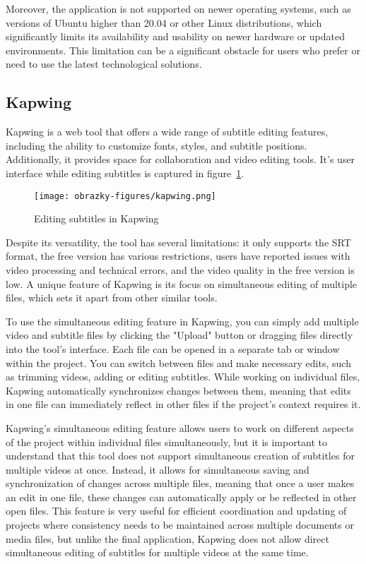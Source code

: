 Moreover, the application is not supported on newer operating systems, such as versions of Ubuntu higher than 20.04 or other Linux distributions, which significantly limits its availability and usability on newer hardware or updated environments. This limitation can be a significant obstacle for users who prefer or need to use the latest technological solutions.

\subsection{Kapwing}

Kapwing is a web tool that offers a wide range of subtitle editing features, including the ability to customize fonts, styles, and subtitle positions. Additionally, it provides space for collaboration and video editing tools. It's user interface while editing subtitles is captured in figure~\ref{fig:kapwing}.

\begin{figure}[ht]
    \centering
    \texttt{[image: obrazky-figures/kapwing.png]}
    \caption{Editing subtitles in Kapwing}
    \label{fig:kapwing}
\end{figure}

Despite its versatility, the tool has several limitations: it only supports the SRT format, the free version has various restrictions, users have reported issues with video processing and technical errors, and the video quality in the free version is low. A unique feature of Kapwing is its focus on simultaneous editing of multiple files, which sets it apart from other similar tools.

To use the simultaneous editing feature in Kapwing, you can simply add multiple video and subtitle files by clicking the "Upload" button or dragging files directly into the tool's interface. Each file can be opened in a separate tab or window within the project. You can switch between files and make necessary edits, such as trimming videos, adding or editing subtitles. While working on individual files, Kapwing automatically synchronizes changes between them, meaning that edits in one file can immediately reflect in other files if the project's context requires it.

Kapwing's simultaneous editing feature allows users to work on different aspects of the project within individual files simultaneously, but it is important to understand that this tool does not support simultaneous creation of subtitles for multiple videos at once. Instead, it allows for simultaneous saving and synchronization of changes across multiple files, meaning that once a user makes an edit in one file, these changes can automatically apply or be reflected in other open files. This feature is very useful for efficient coordination and updating of projects where consistency needs to be maintained across multiple documents or media files, but unlike the final application, Kapwing does not allow direct simultaneous editing of subtitles for multiple videos at the same time.

